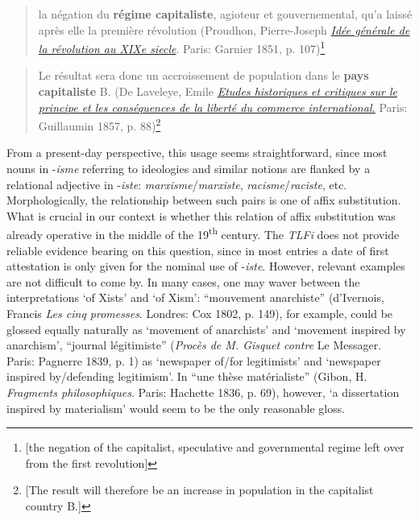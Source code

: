 \documentclass[output=paper]{langsci/langscibook}
\begin{document}
\begin{quote}
la négation du \textbf{régime capitaliste}, agioteur et gouvernemental,
qu'a laissé après elle la première révolution
(Proudhon,
Pierre-Joseph \href{https://www.google.at/search?biw=1440\&bih=808\&tbs=cdr:1,cd_min:01.01.
1850,cd_max:31.12.1870\&tbm=bks\&tbm=bks\&q=inauthor:\%22Pierre-Joseph+Proudhon\%22\&sa=X\&ved=0ahUKEwiXz5DoiJbOAhXIXhQKHVRtDM4Q9AgIPDAD}{\emph{Idée générale de la révolution au XIXe siecle}}.
Paris: Garnier 1851, p. 107)\footnote{{[}the negation of the capitalist,
  speculative and governmental regime left over from the first
  revolution{]}}
\end{quote}

\begin{quote}
Le résultat sera donc un accroissement de population dans le
\textbf{pays capitaliste} B. (De Laveleye, Emile
\href{https://books.google.at/books?id=tIIPAAAAQAAJ\&pg=PA88\&dq=\%22pays+
capitaliste\%22\&hl=de\&sa=X\&ved=0ahUKEwj2kuiEzpjOAhUNrRQKHQsTAk0Q6AEIHjAA}{%
\emph{Etudes
historiques et critiques sur le principe et les conséquences de la
liberté du commerce international.}} Paris: Guillaumin 1857, p.
88)\footnote{{[}The result will therefore be an increase in population
  in the capitalist country B.{]}}
\end{quote}

From a present-day perspective, this usage seems straightforward, since
most nouns in -\emph{isme} referring to ideologies and similar notions
are flanked by a relational adjective in -\emph{iste}:
\emph{marxisme}/\emph{marxiste}, \emph{racisme}/\emph{raciste}, etc.
Morphologically, the relationship between such pairs is one of affix
substitution. What is crucial in our context is whether this relation of
affix substitution was already operative in the middle of the
19\textsuperscript{th} century. The \emph{TLFi} does not provide
reliable evidence bearing on this question, since in most entries a date
of first attestation is only given for the nominal use of -\emph{iste}.
However, relevant examples are not difficult to come by. In many cases,
one may waver between the interpretations `of Xists' and `of Xism':
``mouvement anarchiste'' (d'Ivernois, Francis \emph{Les cinq promesses}.
Londres: Cox 1802, p. 149), for example, could be glossed equally
naturally as `movement of anarchists' and `movement inspired by
anarchism', ``journal légitimiste'' (\emph{Procès de M. Gisquet contre}
Le Messager. Paris: Pagnerre 1839, p. 1) as `newspaper of/for
legitimists' and `newspaper inspired by/defending legitimism'. In ``une
thèse matérialiste'' (Gibon, H. \emph{Fragments philosophiques}. Paris:
Hachette 1836, p. 69), however, `a dissertation inspired by materialism'
would seem to be the only reasonable gloss.
\end{document}
